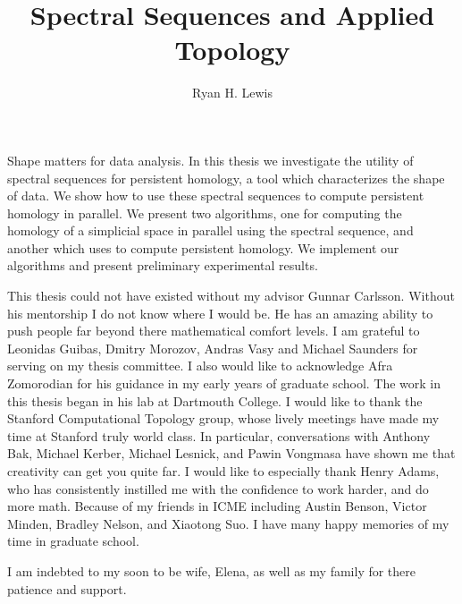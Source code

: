 \documentclass[12pt,twsoside]{report}
\title{Spectral Sequences and Applied Topology}
\author{Ryan H. Lewis}
\begin{document}
\maketitle

%

Shape matters for data analysis. In this thesis we investigate the utility of spectral sequences for persistent homology, a tool which characterizes the shape of data. We show how to use these spectral sequences to compute persistent homology in parallel. We present two algorithms, one for computing the homology of a simplicial space in parallel using the \mv spectral sequence, and another which uses \mv to compute persistent homology. We implement our algorithms and present preliminary experimental results.

This thesis could not have existed without my advisor Gunnar Carlsson. Without his mentorship I do not know where I would be. He has an amazing ability to push people far beyond there mathematical comfort levels. I am grateful to Leonidas Guibas, Dmitry Morozov, Andras Vasy and Michael Saunders for serving on my thesis committee. I also would like to acknowledge Afra Zomorodian for his guidance in my early years of graduate school. The work in this thesis began in his lab at Dartmouth College. I would like to thank the Stanford Computational Topology group, whose lively meetings have made my time at Stanford truly world class. In particular, conversations with Anthony Bak, Michael Kerber, Michael Lesnick, and Pawin Vongmasa have shown me that creativity can get you quite far. I would like to especially thank Henry Adams, who has consistently instilled me with the confidence to work harder, and do more math. Because of my friends in ICME including Austin Benson, Victor Minden, Bradley Nelson, and Xiaotong Suo. I have many happy memories of my time in graduate school. 

\noindent I am indebted to my soon to be wife, Elena, as well as my family for there patience and support.

 \afterpreface
%


\end{document}
